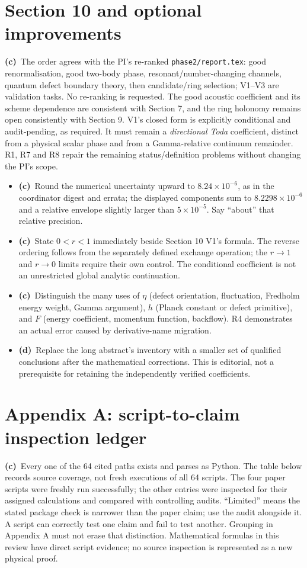 \documentclass[11pt,a4paper]{article}
\newcommand{\C}{\textbf{(c)}\ }
\newcommand{\D}{\textbf{(d)}\ }
\newcommand{\file}[1]{\nolinkurl{#1}}
\begin{document}
\section{Section 10 and optional improvements}
\C The order agrees with the PI's re-ranked \file{phase2/report.tex}:
good renormalisation, good two-body phase, resonant/number-changing channels,
quantum defect boundary theory, then candidate/ring selection; V1--V3 are
validation tasks. No re-ranking is requested. The good acoustic coefficient
and its scheme dependence are consistent with Section 7, and the ring
holonomy remains open consistently with Section 9.
V1's closed form is explicitly conditional and audit-pending, as required.
It must remain a \emph{directional Toda} coefficient, distinct from a
physical scalar phase and from a Gamma-relative continuum remainder.
R1, R7 and R8 repair the remaining status/definition problems without
changing the PI's scope.

\begin{itemize}
\item \C Round the numerical uncertainty upward to $8.24\times10^{-6}$,
as in the coordinator digest and errata; the displayed components sum to
$8.2298\times10^{-6}$ and a relative envelope slightly larger than
$5\times10^{-5}$. Say ``about'' that relative precision.
\item \C State $0<r<1$ immediately beside Section 10 V1's formula.
The reverse ordering follows from the separately defined exchange operation;
the $r\to1$ and $r\to0$ limits require their own control. The conditional
coefficient is not an unrestricted global analytic continuation.
\item \C Distinguish the many uses of $\eta$ (defect orientation, fluctuation,
Fredholm energy weight, Gamma argument), $h$ (Planck constant or defect
primitive), and $F$ (energy coefficient, momentum function, backflow).
R4 demonstrates an actual error caused by derivative-name migration.
\item \D Replace the long abstract's inventory with a smaller set of
qualified conclusions after the mathematical corrections. This is editorial,
not a prerequisite for retaining the independently verified coefficients.
\end{itemize}

\section{Appendix A: script-to-claim inspection ledger}
\C Every one of the 64 cited paths exists and parses as Python. The table
below records source coverage, not fresh executions of all 64 scripts.
The four paper scripts were freshly run successfully; the other entries
were inspected for their assigned calculations and compared with controlling
audits. ``Limited'' means the stated package check is narrower than the
paper claim; use the audit alongside it. A script can correctly test one
claim and fail to test another. Grouping in Appendix A must not erase that
distinction. Mathematical formulas in this review have direct script
evidence; no source inspection is represented as a new physical proof.
\end{document}
